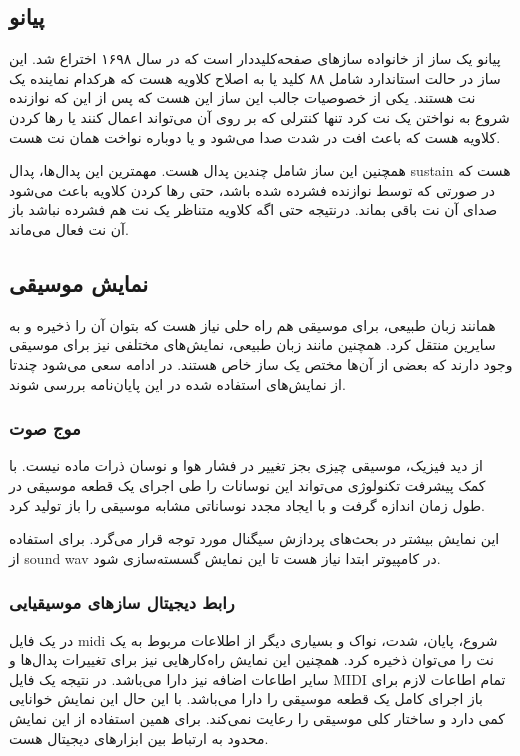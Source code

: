 \subsection{پیانو}
پیانو یک ساز از خانواده ساز‌های صفحه‌کلیددار است که در سال ۱۶۹۸ اختراع شد. این
ساز در حالت استاندارد شامل ۸۸ کلید یا به اصلاح کلاویه هست که هرکدام نماینده یک
نت هستند. یکی از خصوصیات جالب این ساز این هست که پس از این که نوازنده شروع به
نواختن یک نت کرد تنها کنترلی که بر روی آن می‌تواند اعمال کنند یا رها کردن کلاویه
هست که باعث افت در شدت صدا می‌شود و یا دوباره نواخت همان نت هست.

همچنین این ساز شامل چندین پدال هست. مهمترین این پدال‌ها، پدال \gls{sustain} هست
که در صورتی که توسط نوازنده فشرده شده باشد، حتی رها کردن کلاویه باعث می‌شود صدای
آن نت باقی بماند. درنتیجه حتی اگه کلاویه متناظر یک نت هم فشرده نباشد باز آن نت
فعال می‌ماند.

\subsection{نمایش موسیقی}
همانند زبان طبیعی، برای موسیقی هم راه حلی نیاز هست که بتوان آن را ذخیره و به
سایرین منتقل کرد. همچنین مانند زبان طبیعی، نمایش‌های مختلفی نیز برای موسیقی وجود
دارند که بعضی‌ از آن‌ها مختص یک ساز خاص هستند. در ادامه سعی می‌شود چندتا از
نمایش‌های استفاده شده در این پایان‌نامه بررسی شوند.

\subsubsection{موج صوت}
از دید فیزیک، موسیقی چیزی بجز تغییر در فشار هوا و نوسان ذرات ماده نیست. با کمک
پیشرفت تکنولوژی می‌تواند این نوسانات را طی اجرای یک قطعه موسیقی در طول زمان
اندازه گرفت و با ایجاد مجدد نوساناتی مشابه موسیقی را باز تولید کرد.

این نمایش بیشتر در بحث‌های پردازش سیگنال مورد توجه قرار می‌گرد. برای استفاده
از \gls{sound wav} در کامپیوتر ابتدا نیاز هست تا این نمایش گسسته‌سازی شود.

\subsubsection{رابط دیجیتال سازهای موسیقیایی}
در یک فایل \gls{midi} شروع، پایان، شدت، نواک و بسیاری دیگر از اطلاعات مربوط به
یک نت را می‌توان ذخیره کرد. همچنین این نمایش راه‌کارهایی نیز برای تغییرات
پدال‌ها و سایر اطاعات اضافه نیز دارا می‌باشد. در نتیجه یک فایل \gls{MIDI} تمام
اطاعات لازم برای باز اجرای کامل یک قطعه موسیقی را دارا می‌باشد. با این حال این
نمایش خوانایی کمی‌ دارد و ساختار کلی موسیقی را رعایت نمی‌کند. برای همین استفاده
از این نمایش محدود به ارتباط بین ابزارهای دیجیتال هست.

